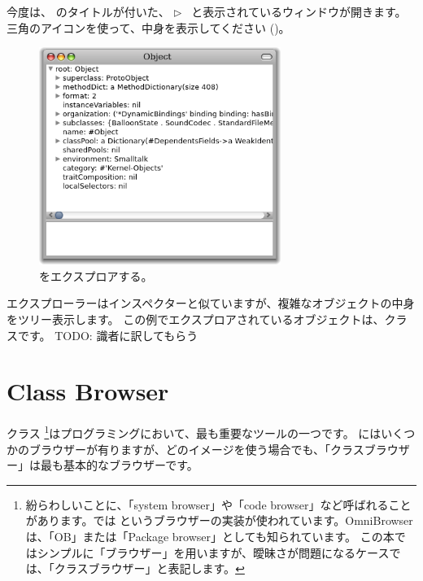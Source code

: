 \documentclass[a4paper,10pt,twoside]{book}
\begin{document}


今度は、 のタイトルが付いた、
\mbox{$\triangleright$ } と表示されているウィンドウが開きます。
三角のアイコンを使って、中身を表示してください ()。

\begin{figure}[htb]
\centerline {\includegraphics[width=0.7\textwidth]{ExploreIt}}
\caption{をエクスプロアする。}
\end{figure}

エクスプローラーはインスペクターと似ていますが、複雑なオブジェクトの中身をツリー表示します。
この例でエクスプロアされているオブジェクトは、クラスです。
TODO: 識者に訳してもらう

\section{Class Browser}

クラス \footnote{紛らわしいことに、「system browser」や「code browser」など呼ばれることがあります。\pharo では というブラウザーの実装が使われています。OmniBrowserは、「OB」または「Package browser」としても知られています。
この本ではシンプルに「ブラウザー」を用いますが、曖昧さが問題になるケースでは、「クラスブラウザー」と表記します。}はプログラミングにおいて、最も重要なツールの一つです。
\pharo にはいくつかのブラウザーが有りますが、どのイメージを使う場合でも、「クラスブラウザー」は最も基本的なブラウザーです。
\end{document}
